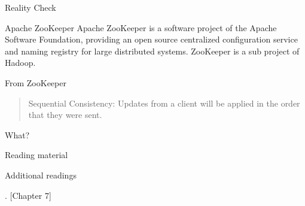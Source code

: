 \begin{frame}{Reality Check}

\begin{block}{Apache ZooKeeper}
Apache ZooKeeper is a software project of the Apache Software Foundation,
providing an open source centralized configuration service and naming registry
for large distributed systems. ZooKeeper is a sub project of Hadoop.
\end{block}

\smallskip
\begin{block}{From ZooKeeper}
\begin{quote}
\alert{Sequential Consistency}: Updates from a client will be applied in the order that they were sent.
\end{quote}
\end{block}

\bigskip
What?

\end{frame}

\begin{frame}{Reading material}

\begin{Bib}
{\footnotesize
\BIL
\item {}
\EIL
}
\end{Bib}

% 
%  

\end{frame}

\begin{frame}{Additional readings}

\begin{Bib}
{\footnotesize
\BI
\item \alert{}
\item {}
\item {}. [Chapter 7]
\EI
}
\end{Bib}

% 
%  

\end{frame}



